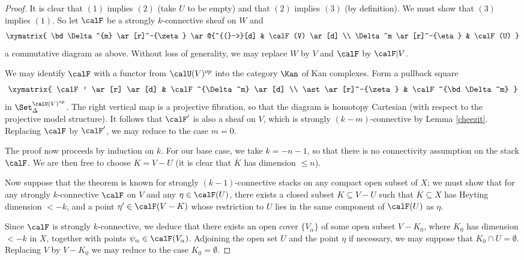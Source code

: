\begin{proof}
It is clear that $(1)$ implies $(2)$ (take $U$ to be empty) and
that $(2)$ implies $(3)$ (by definition). We must show that $(3)$
implies $(1)$. So let $\calF$ be a strongly $k$-connective sheaf on $W$
and $$ \xymatrix{ \bd \Delta^{m} \ar[r]^-{\zeta} \ar@{^{(}->}[d]  & \calF(V) \ar[d] \\
\Delta^m \ar[r]^-{\eta} & \calF(U) }$$
a commutative diagram as above. Without loss of generality, we may replace $W$ by $V$ and $\calF$ by $\calF|V$.

We may identify $\calF$ with a functor from $\calU(V)^{op}$ into the category $\Kan$ of Kan complexes. Form a pullback square 
$$ \xymatrix{ \calF' \ar[r] \ar[d] & \calF^{\Delta^m} \ar[d] \\
\ast \ar[r]^-{\zeta} & \calF^{\bd \Delta^m} }$$
in $\Set_{\Delta}^{ \calU(V)^{op} }$. The right vertical map is a projective fibration, so that
the diagram is homotopy Cartesian (with respect to the projective model structure).
It follows that $\calF'$ is also a sheaf on $V$, which is strongly $(k-m)$-connective by Lemma \ref{cheezit}. Replacing $\calF$ by $\calF'$, we may reduce to the case $m=0$.

The proof now proceeds by induction on $k$. For our base case, we take
$k=-n-1$, so that there is no connectivity assumption on the stack
$\calF$. We are then free to choose $K = V-U$ (it is clear that
$\overline{K}$ has dimension $\leq n$).

Now suppose that the theorem is known for strongly
$(k-1)$-connective stacks on any compact open subset of $X$; we
must show that for any strongly $k$-connective $\calF$ on $V$ and
any $\eta \in \calF(U)$, there exists a closed subset
$K \subseteq V-U$ such that $\overline{K} \subseteq X$ has Heyting dimension
$ < -k$, and a point $\eta' \in \calF(V-K)$ whose restriction to $U$ lies in
the same component of $\calF(U)$ as $\eta$.

Since $\calF$ is strongly $k$-connective, we deduce that there
exists an open cover $\{V_{\alpha} \}$ of some open subset
$V-K_0$, where $K_0$ has dimension $< -k$ in $X$, together with
points $\psi_{\alpha} \in \calF( V_{\alpha})$. Adjoining
the open set $U$ and the point $\eta$ if necessary, we may suppose
that $K_0 \cap U = \emptyset$. Replacing $V$ by
$V- K_0$ we may reduce to the case $K_0 = \emptyset$.


\end{proof}
